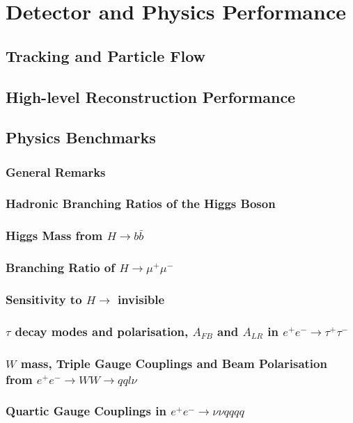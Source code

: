 \chapter{Detector and Physics Performance}
\section{Tracking and Particle Flow}
\section{High-level Reconstruction Performance}
\section{Physics Benchmarks}
\subsection{General Remarks}
\subsection{Hadronic Branching Ratios of the Higgs Boson}
\subsection{Higgs Mass from $H \to b\bar{b}$}
\subsection{Branching Ratio of $H \to \mu^+\mu^-$}
\subsection{Sensitivity to $H \to $ invisible}
\subsection{$\tau$ decay modes and polarisation, $A_{FB}$ and $A_{LR}$ in $e^+e^- \to \tau^+\tau^-$}
\subsection{$W$ mass, Triple Gauge Couplings and Beam Polarisation from $e^+e^- \to WW \to qql\nu$}
\subsection{Quartic Gauge Couplings in $e^+e^- \to \nu\nu qqqq$}

